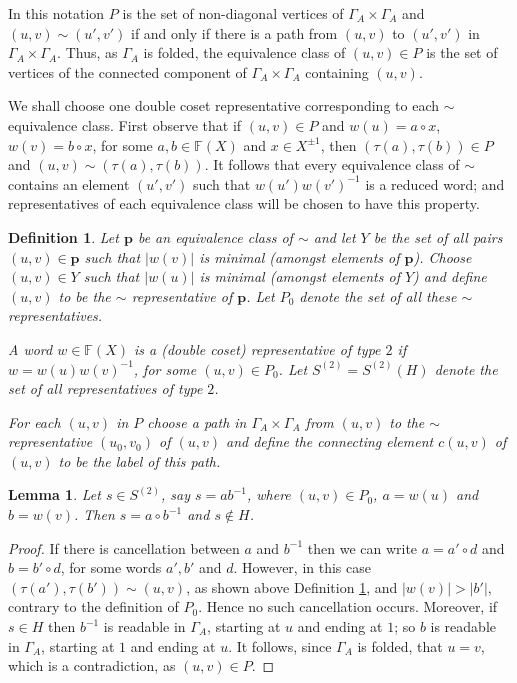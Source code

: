 \documentclass[a4paper,12pt]{article}
\newcommand{\G}{\Gamma }
\renewcommand{\t}{\tau }
\newcommand{\pp}{\mathbf{p}}
\newtheorem{lemma}[theorem]{Lemma}
\newtheorem{definition}[theorem]{Definition}
\numberwithin{equation}{section}
\numberwithin{figure}{section}
\newcommand{\FF}{\ensuremath{\mathbb{F}}}
\begin{document}
In this notation $P$ is the set of non-diagonal vertices of
$\G_A\times \G_A$ and $(u,v)\sim (u',v')$ if and only if there is
a path from $(u,v)$ to $(u',v')$ in $\G_A\times \G_A$.
 Thus, as $\G_A$ is folded, the equivalence class of $(u,v)\in P$
is the set of vertices of the connected component of $\G_A\times \G_A$
containing $(u,v)$.

We shall choose one double coset representative corresponding to
each $\sim$ equivalence class. First observe that if
$(u,v)\in P$ and $w(u)=a\circ x$, $w(v)=b\circ x$, for some
$a,b\in \FF(X)$ and $x\in X^{\pm 1}$, then $(\t(a),\t(b))\in P$ and
$(u,v)\sim (\t(a),\t(b))$. It follows that every equivalence  class
of $\sim$ contains an element $(u',v')$ such that
$w(u')w(v')^{-1}$ is a reduced word; and representatives of each
equivalence class will be chosen to have this property.

\begin{definition}\label{def:repres_t2}
Let $\pp$ be an equivalence class of $\sim$ and let $Y$ be the set
of all pairs $(u,v)\in \pp$ such that $|w(v)|$ is minimal (amongst
elements of $\pp$). Choose $(u,v)\in Y$ such that $|w(u)|$ is
minimal (amongst elements of $Y$) and define $(u,v)$ to be the
$\sim$ {\em representative} of
$\pp$. %
Let $P_0$ denote the set of  all these $\sim$
representatives.

A word $w\in \FF(X)$ is
 a {\em (double coset) representative of type} $2$
if $w=w(u)w(v)^{-1}$, for some $(u,v)\in P_0$.
Let $S^{(2)}=S^{(2)}(H)$ denote the set of all representatives of type $2$.

For each $(u,v)$ in $P$ choose a path in $\G_A\times \G_A$
from $(u,v)$ to the $\sim$ representative
$(u_0,v_0)$ of $(u,v)$ and define the {\em connecting element}
$c(u,v)$  of $(u,v)$ to be the label of this path.
\end{definition}

\begin{lemma}\label{lem:rep2}
Let $s\in S^{(2)}$, say $s=ab^{-1}$, where $(u,v)\in P_0$, 
$a=w(u)$ and $b=w(v)$. Then
$s=a\circ b^{-1}$ and $s\notin H$.
\end{lemma}
\begin{proof}
If there is cancellation between $a$ and $b^{-1}$ then we can
 write $a=a'\circ d$ and $b=b'\circ d$, for some words $a',b'$ and $d$. 
However, in this case $(\t(a'),\t(b'))\sim (u,v)$, as shown above
Definition \ref{def:repres_t2}, and $|w(v)|>|b'|$, contrary to the
definition of $P_0$. Hence no such cancellation occurs. Moreover, 
if $s\in H$ then $b^{-1}$ is readable in $\G_A$, starting at $u$ 
and ending at $1$; so
$b$ is readable in $\G_A$, starting at $1$ and ending at $u$. It
follows, since $\G_A$ is folded, that $u=v$, which is a contradiction, 
as $(u,v)\in P$.  
\end{proof}
\end{document}
